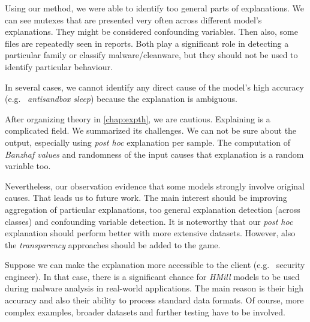 Using our method, we were able to identify too general parts of explanations. We can see mutexes that are presented very often across different model's explanations. They might be considered confounding variables. Then also, some files are repeatedly seen in reports. Both play a significant role in detecting a particular family or classify malware/cleanware, but they should not be used to identify particular behaviour.

In several cases, we cannot identify any direct cause of the model's high accuracy (e.g. \ \emph{antisandbox sleep}) because the explanation is ambiguous.

\hfill \break

After organizing theory in \ref{chap:expth}, we are cautious. Explaining is a complicated field. We summarized its challenges. We can not be sure about the output, especially using \emph{post hoc} explanation per sample. The computation of \emph{Banzhaf values} and randomness of the input causes that explanation is a random variable too. 

Nevertheless, our observation evidence that some models strongly involve original causes. That leads us to future work. The main interest should be improving aggregation of particular explanations, too general explanation detection (across classes) and confounding variable detection. It is noteworthy that our \emph{post hoc} explanation should perform better with more extensive datasets. However, also the \emph{transparency} approaches should be added to the game. 

Suppose we can make the explanation more accessible to the client (e.g. \ security engineer). In that case, there is a significant chance for \emph{HMill} models to be used during malware analysis in real-world applications. The main reason is their high accuracy and also their ability to process standard data formats. Of course, more complex examples, broader datasets and further testing have to be involved.


